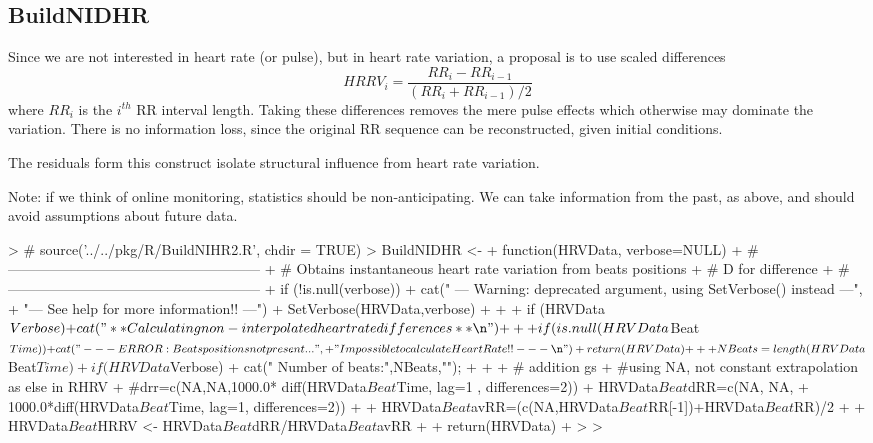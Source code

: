 \documentclass[a4paper, english, utf8]{amsart}
\begin{document}
\subsection{BuildNIDHR}


Since we are not interested in heart rate (or pulse), but in heart rate variation, a proposal is to use scaled differences
$$
HRRV_i = \frac{RR_i - RR_{i-1}}{(RR_i + RR_{i-1})/2}
$$
where $RR_i$ is the $i^{th}$ RR interval length. Taking these differences removes the mere pulse effects which otherwise may dominate the variation. There is no information loss, since the original RR sequence can be reconstructed, given initial conditions.

The residuals form this construct isolate structural influence from heart rate variation.

Note: if we think of online monitoring, statistics should be non-anticipating. We can take information from the past, as above, and should avoid assumptions about future data.


\begin{Schunk}
\begin{Sinput}
> # source('../../pkg/R/BuildNIHR2.R', chdir = TRUE)
> BuildNIDHR <-
+ function(HRVData, verbose=NULL) {
+ #------------------------------------------------------ 
+ # Obtains instantaneous heart rate variation from beats positions
+ # D for difference
+ #------------------------------------------------------ 
+ if (!is.null(verbose)) {
+ 	cat("  --- Warning: deprecated argument, using SetVerbose() instead ---\n",
+ 	    "--- See help for more information!! ---\n")
+ 	SetVerbose(HRVData,verbose)
+ }
+ 
+ if (HRVData$Verbose) {
+ 	cat("** Calculating non-interpolated heart rate differences **\n")
+ }
+ 
+ if (is.null(HRVData$Beat$Time)) {
+ 	cat("   --- ERROR: Beats positions not present... ",
+ 	"Impossible to calculate Heart Rate!! ---\n")
+ 	return(HRVData)
+ }
+ 
+ NBeats=length(HRVData$Beat$Time)
+ if (HRVData$Verbose) {
+ 	cat("   Number of beats:",NBeats,"\n");
+ }
+ 
+   # addition gs 
+    #using NA, not constant extrapolation as else in RHRV  
+    #drr=c(NA,NA,1000.0*	diff(HRVData$Beat$Time, lag=1 , differences=2))
+    HRVData$Beat$dRR=c(NA, NA, 
+    	1000.0*diff(HRVData$Beat$Time, lag=1, differences=2))
+ 
+    HRVData$Beat$avRR=(c(NA,HRVData$Beat$RR[-1])+HRVData$Beat$RR)/2
+    
+    HRVData$Beat$HRRV <- HRVData$Beat$dRR/HRVData$Beat$avRR
+ 
+ 	return(HRVData)
+ }
> 
> 
\end{Sinput}
\end{Schunk}
\clearpage
\end{document}
